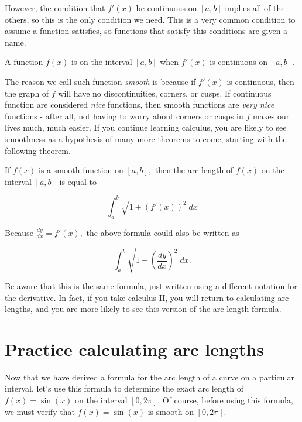 \documentclass[handout,nooutcomes]{ximera}
\begin{document}
However, the condition that $f'(x)$ be continuous on $[a,b]$ implies all of the others, so this is the only condition we need.  This is a very common condition to assume a function satisfies, so functions that satisfy this conditions are given a name.  

\begin{definition}
A function $f(x)$ is  on the interval $[a,b]$ when $f'(x)$ is continuous on $[a,b].$
\end{definition}

The reason we call such function \textit{smooth} is because if $f'(x)$ is continuous, then the graph of $f$ will have no discontinuities, corners, or cusps.  If continuous function are considered \textit{nice} functions, then smooth functions are \textit{very nice} functions - after all, not having to worry about corners or cusps in $f$ makes our lives much, much easier.  If you continue learning calculus, you are likely to see smoothness as a hypothesis of many more theorems to come, starting with the following theorem. 

\begin{theorem}
If $f(x)$ is a smooth function on $[a,b],$ then the arc length of $f(x)$ on the interval $[a,b]$ is equal to 

$$\displaystyle\int_{a}^{b} \sqrt{1+(f'(x))^2} \ dx$$

\end{theorem}

\begin{warning}
Because $\frac{dy}{dx} = f'(x),$ the above formula could also be written as 

$$\displaystyle\int_{a}^{b} \sqrt{1+\left(\frac{dy}{dx}\right)^2} \ dx.$$ 

Be aware that this is the same formula, just written using a different notation for the derivative.  In fact, if you take calculus II, you will return to calculating arc lengths, and you are more likely to see this version of the arc length formula.  
\end{warning}

\section{Practice calculating arc lengths}


Now that we have derived a formula for the arc length of a curve on a particular interval, let's use this formula to determine the exact arc length of $f(x)=\sin(x)$ on the interval $[0,2\pi]$.  Of course, before using this formula, we must verify that $f(x)=\sin(x)$ is smooth on $[0,2\pi]$.
\end{document}
